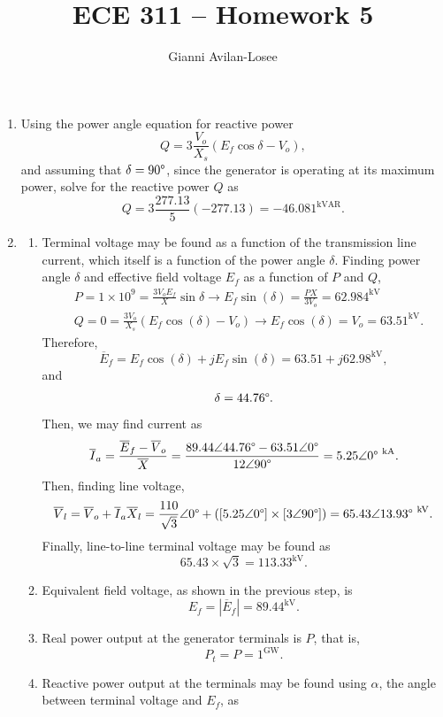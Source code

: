\documentclass{article}
\title{ECE 311 -- Homework 5}
\author{Gianni Avilan-Losee}
\begin{document}

\begin{enumerate}[label=\thesubsection]
	\setcounter{section}{12}
	\setcounter{subsection}{17}
	\item Using the power angle equation for reactive power
		\[
			Q = 3 \frac{V_o}{X_s} (E_f\cos{\delta} - V_o),
		\]
		and assuming that \(\delta = 90\degree\), since the generator is operating at its maximum power, solve for the reactive power \(Q\) as
		\[
			Q = 3 \frac{277.13}{5}(-277.13) = -46.081^{\mathrm{kVAR}}.
		\]
		\setcounter{subsection}{18}
		\item
			\begin{enumerate}[label=\alph*)]
				\item Terminal voltage may be found as a function of the transmission line current, which itself is a function of the power angle \(\delta\). Finding power angle \(\delta\) and effective field voltage \(E_f\) as a function of \(P\) and \(Q\),
					\begin{align*}
						&P = 1 \times 10^9 = \frac{3 V_o E_f}{X} \sin{\delta} \to E_f \sin{(\delta)} = \frac{PX}{3 V_o} = 62.984^{\mathrm{kV}} \\
						&Q = 0 = \frac{3V_o}{X_s}(E_f \cos{(\delta)} - V_o) \to E_f \cos{(\delta)} = V_o = 63.51^{\mathrm{kV}}.
					\end{align*}
					Therefore, 
					\[
						\overline{E}_f = E_f\cos{(\delta)} + jE_f\sin{(\delta)} = 63.51 + j62.98^{\mathrm{kV}},
					\]
					and
					\[
					  \delta = 44.76\degree.
					\]
					Then, we may find current as 
					\[
						\overline{I}_a = \frac{\overline{E}_f - \overline{V}_o}{\overline{X}} = \frac{89.44 \angle{44.76\degree} - 63.51\angle{0\degree}}{12 \angle{90\degree}} =  5.25 \angle{0 \degree}^{\ \mathrm{kA}}.
					\]
					Then, finding line voltage,
					\[
						\overline{V}_l = \overline{V}_o + \overline{I}_a \overline{X}_l = \frac{110}{\sqrt{3}}\angle{0\degree} + ([5.25 \angle{0\degree}] \times [3\angle{90\degree}]) = 65.43 \angle{13.93\degree}^{\ \mathrm{kV}}.
					\]
					Finally, line-to-line terminal voltage may be found as 
					\[
						65.43 \times \sqrt{3} = 113.33^{\mathrm{kV}}.
					\]
				\item Equivalent field voltage, as shown in the previous step, is
					\[
						E_f = |\overline{E}_f| = 89.44^{\mathrm{kV}}.
					\]
				\item Real power output at the generator terminals is \(P\), that is,
					\[
						P_t = P = 1^{\mathrm{GW}}.
					\]
				\item Reactive power output at the terminals may be found using \(\alpha\), the angle between terminal voltage and \(E_f\), as

\end{enumerate}
\end{enumerate}
\end{document}
